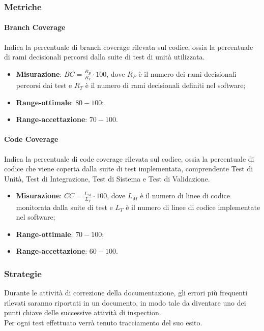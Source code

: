 \subsubsection{Metriche}
\paragraph{Branch Coverage}
\label{coperturaTest}
Indica la percentuale di branch coverage rilevata sul codice, ossia la percentuale di rami decisionali percorsi dalla suite di test di unità utilizzata.
\begin{itemize}
\item \textbf{Misurazione}: $BC=\frac{R_{P}}{R_{T}} \cdot 100$, dove $R_{P}$ è il numero dei rami decisionali percorsi dai test e $R_{T}$ è il numero di rami decisionali definiti nel software;
\item \textbf{Range-ottimale}: $80 - 100$;
\item \textbf{Range-accettazione}: $70 - 100$.
\end{itemize}
\paragraph{Code Coverage}
\label{codeCoverage}
Indica la percentuale di code coverage rilevata sul codice, ossia la percentuale di codice che viene coperta dalla suite di test implementata, comprendente Test di Unità, Test di Integrazione, Test di Sistema e Test di Validazione.
\begin{itemize}
\item \textbf{Misurazione}: $CC=\frac{L_{M}}{L_{T}} \cdot 100$, dove $L_{M}$ è il numero di linee di codice monitorata dalla suite di test e $L_{T}$ è il numero di linee di codice implementate nel software;
\item \textbf{Range-ottimale}: $70 - 100$;
\item \textbf{Range-accettazione}: $60 - 100$.
\end{itemize}
\subsubsection{Strategie}
Durante le attività di correzione della documentazione, gli errori più frequenti rilevati saranno riportati in un documento, in modo tale da diventare uno dei punti chiave delle successive attività di inspection.\\
Per ogni test effettuato verrà tenuto tracciamento del suo esito.